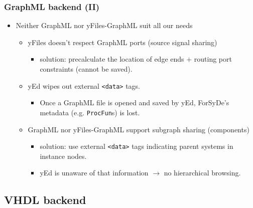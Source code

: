 \documentclass{beamer}
\begin{document}
\beamerdefaultoverlayspecification{<+->}
\begin{frame}
  \frametitle{GraphML backend (II)}
  \begin{itemize}
  \item Neither GraphML nor yFiles-GraphML suit all our needs
    \begin{itemize}
    \item yFiles doesn't respect GraphML ports (source signal
      sharing)
      \begin{itemize}
      \item solution: precalculate the location of
        edge ends $+$ routing port constraints (cannot be saved).
      \end{itemize}
    \item yEd wipes out external \texttt{<data>} tags.
      \begin{itemize}
      \item Once a GraphML file is opened and saved by yEd, ForSyDe's metadata
        (e.g. \texttt{ProcFun}s) is lost.
      \end{itemize}
    \item GraphML nor yFiles-GraphML support subgraph sharing
      (components)
      \begin{itemize}
      \item solution: use external \texttt{<data>} tags indicating
        parent systems in instance nodes.
      \item yEd is unaware of that information $\rightarrow$
        no hierarchical browsing.
      \end{itemize}      
    \end{itemize}
  \end{itemize}
  
\end{frame}


\subsection{VHDL backend}
\end{document}
